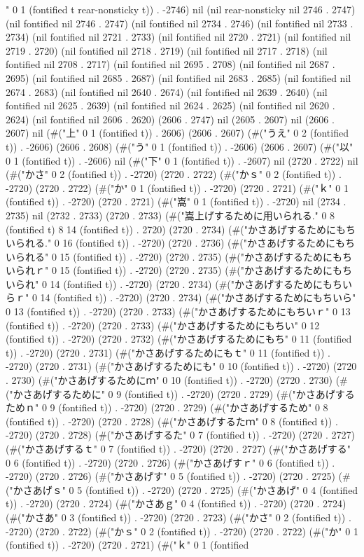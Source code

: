 " 0 1 (fontified t rear-nonsticky t)) . -2746) nil (nil rear-nonsticky nil 2746 . 2747) (nil fontified nil 2746 . 2747) (nil fontified nil 2734 . 2746) (nil fontified nil 2733 . 2734) (nil fontified nil 2721 . 2733) (nil fontified nil 2720 . 2721) (nil fontified nil 2719 . 2720) (nil fontified nil 2718 . 2719) (nil fontified nil 2717 . 2718) (nil fontified nil 2708 . 2717) (nil fontified nil 2695 . 2708) (nil fontified nil 2687 . 2695) (nil fontified nil 2685 . 2687) (nil fontified nil 2683 . 2685) (nil fontified nil 2674 . 2683) (nil fontified nil 2640 . 2674) (nil fontified nil 2639 . 2640) (nil fontified nil 2625 . 2639) (nil fontified nil 2624 . 2625) (nil fontified nil 2620 . 2624) (nil fontified nil 2606 . 2620) (2606 . 2747) nil (2605 . 2607) nil (2606 . 2607) nil (#("上" 0 1 (fontified t)) . 2606) (2606 . 2607) (#("うえ" 0 2 (fontified t)) . -2606) (2606 . 2608) (#("う" 0 1 (fontified t)) . -2606) (2606 . 2607) (#("以" 0 1 (fontified t)) . -2606) nil (#("下" 0 1 (fontified t)) . -2607) nil (2720 . 2722) nil (#("かさ" 0 2 (fontified t)) . -2720) (2720 . 2722) (#("かｓ" 0 2 (fontified t)) . -2720) (2720 . 2722) (#("か" 0 1 (fontified t)) . -2720) (2720 . 2721) (#("ｋ" 0 1 (fontified t)) . -2720) (2720 . 2721) (#("嵩" 0 1 (fontified t)) . -2720) nil (2734 . 2735) nil (2732 . 2733) (2720 . 2733) (#("嵩上げするために用いられる." 0 8 (fontified t) 8 14 (fontified t)) . 2720) (2720 . 2734) (#("かさあげするためにもちいられる." 0 16 (fontified t)) . -2720) (2720 . 2736) (#("かさあげするためにもちいられる" 0 15 (fontified t)) . -2720) (2720 . 2735) (#("かさあげするためにもちいられｒ" 0 15 (fontified t)) . -2720) (2720 . 2735) (#("かさあげするためにもちいられ" 0 14 (fontified t)) . -2720) (2720 . 2734) (#("かさあげするためにもちいらｒ" 0 14 (fontified t)) . -2720) (2720 . 2734) (#("かさあげするためにもちいら" 0 13 (fontified t)) . -2720) (2720 . 2733) (#("かさあげするためにもちいｒ" 0 13 (fontified t)) . -2720) (2720 . 2733) (#("かさあげするためにもちい" 0 12 (fontified t)) . -2720) (2720 . 2732) (#("かさあげするためにもち" 0 11 (fontified t)) . -2720) (2720 . 2731) (#("かさあげするためにもｔ" 0 11 (fontified t)) . -2720) (2720 . 2731) (#("かさあげするためにも" 0 10 (fontified t)) . -2720) (2720 . 2730) (#("かさあげするためにｍ" 0 10 (fontified t)) . -2720) (2720 . 2730) (#("かさあげするために" 0 9 (fontified t)) . -2720) (2720 . 2729) (#("かさあげするためｎ" 0 9 (fontified t)) . -2720) (2720 . 2729) (#("かさあげするため" 0 8 (fontified t)) . -2720) (2720 . 2728) (#("かさあげするたｍ" 0 8 (fontified t)) . -2720) (2720 . 2728) (#("かさあげするた" 0 7 (fontified t)) . -2720) (2720 . 2727) (#("かさあげするｔ" 0 7 (fontified t)) . -2720) (2720 . 2727) (#("かさあげする" 0 6 (fontified t)) . -2720) (2720 . 2726) (#("かさあげすｒ" 0 6 (fontified t)) . -2720) (2720 . 2726) (#("かさあげす" 0 5 (fontified t)) . -2720) (2720 . 2725) (#("かさあげｓ" 0 5 (fontified t)) . -2720) (2720 . 2725) (#("かさあげ" 0 4 (fontified t)) . -2720) (2720 . 2724) (#("かさあｇ" 0 4 (fontified t)) . -2720) (2720 . 2724) (#("かさあ" 0 3 (fontified t)) . -2720) (2720 . 2723) (#("かさ" 0 2 (fontified t)) . -2720) (2720 . 2722) (#("かｓ" 0 2 (fontified t)) . -2720) (2720 . 2722) (#("か" 0 1 (fontified t)) . -2720) (2720 . 2721) (#("ｋ" 0 1 (fontified 